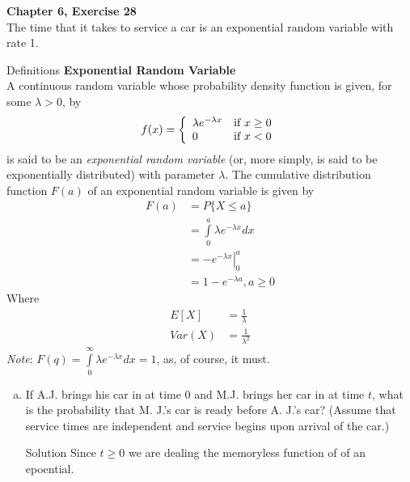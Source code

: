 \documentclass{article}
\begin{document}
\begin{spacing}{1.1}
\newpage
\begin{homeworkProblem}
  {\bf Chapter 6, Exercise 28}\\
  The time that it takes to service a car is an exponential 
  random variable with rate 1.
  \begin{homeworkSection}{Definitions}
    {\bf Exponential Random Variable}\\
    A continuous random variable whose probability density 
    function is given, for some $\lambda > 0$, by
      \[
        f(x) = \left\{
          \begin{array}{l l}
            \lambda e^{-\lambda x} &\text{if } x \ge 0\\
            0 &\text{if } x < 0
          \end{array} \right.
      \]
    is said to be an \emph{exponential random variable} (or, more simply, 
    is said to be exponentially distributed) with parameter $\lambda$. 
    The cumulative distribution function $F( a)$ of an exponential 
    random variable is given by
      \begin{align*}
        F(a) &= P\{ X \le a \}\\
        &= \int\limits_0^a \lambda e^{-\lambda x} dx\\
        &= \left.-e^{-\lambda x}\right|_0^a\\
        &= 1 - e^{-\lambda a},  a \ge 0
      \end{align*}
    Where
      \begin{align*}
        E[ X] &= \frac{ 1}{ \lambda}\\
        Var( X) &= \frac{ 1}{ \lambda^2}
      \end{align*}
    \emph{Note}: $F(q) = \int\limits_0^\infty \lambda e^{-\lambda x} dx = 1$, 
    as, of course, it must.
  \end{homeworkSection}
  \begin{enumerate}[(a)]
    \item If A.J. brings his car in at time 0 and M.J.
    brings her car in at time $t$, what is the probability 
    that M. J.'s car is ready before A. J.'s car? 
    (Assume that service times are independent and service 
    begins upon arrival of the car.)
      \begin{homeworkSection}{Solution}
        Since $t \ge 0$ we are dealing the memoryless function of
        of an epoential.
        

\end{homeworkSection}
\end{enumerate}
\end{homeworkProblem}
\end{spacing}
\end{document}
